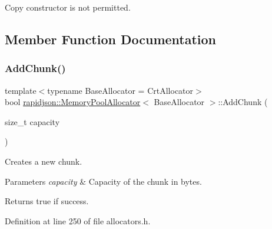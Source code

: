 Copy constructor is not permitted. 



\subsection{Member Function Documentation}
\mbox{\label{classrapidjson_1_1_memory_pool_allocator_aa35232aea8863efcdf29139f42c6ef68}} 
\subsubsection{\texorpdfstring{AddChunk()}{AddChunk()}}
{\footnotesize\ttfamily template$<$typename Base\+Allocator = Crt\+Allocator$>$ \\
bool \mbox{\hyperlink{classrapidjson_1_1_memory_pool_allocator}{rapidjson\+::\+Memory\+Pool\+Allocator}}$<$ Base\+Allocator $>$\+::Add\+Chunk (\begin{DoxyParamCaption}\item[{size\+\_\+t}]{capacity }\end{DoxyParamCaption})\hspace{0.3cm}{\ttfamily [private]}}



Creates a new chunk. 


\begin{DoxyParams}{Parameters}
{\em capacity} & Capacity of the chunk in bytes. \\
\hline
\end{DoxyParams}
\begin{DoxyReturn}{Returns}
true if success. 
\end{DoxyReturn}


Definition at line 250 of file allocators.\+h.


